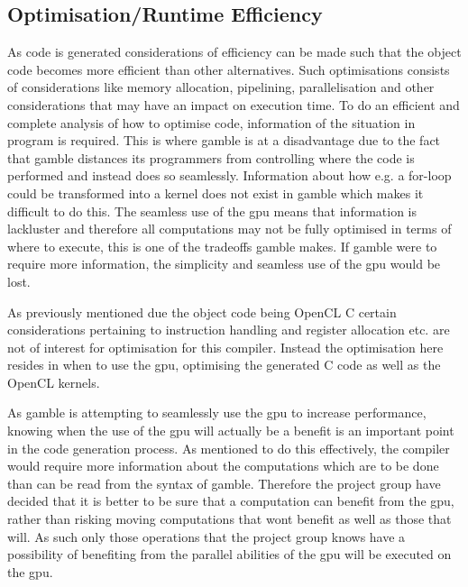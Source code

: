 \subsection*{Optimisation/Runtime Efficiency}\label{optimisation}
As code is generated considerations of efficiency can be made such that the object code becomes more efficient than other alternatives.
Such optimisations consists of considerations like memory allocation, pipelining, parallelisation and other considerations that may have an impact on execution time.
To do an efficient and complete analysis of how to optimise code, information of the situation in program is required.
This is where \gls{gamble} is at a disadvantage due to the fact that \gls{gamble} distances its programmers from controlling where the code is performed and instead does so seamlessly.
Information about how e.g. a for-loop could be transformed into a kernel does not exist in \gls{gamble} which makes it difficult to do this.
The seamless use of the \acrshort{gpu} means that information is lackluster and therefore all computations may not be fully optimised in terms of where to execute, this is one of the tradeoffs \gls{gamble} makes.
If \gls{gamble} were to require more information, the simplicity and seamless use of the \acrshort{gpu} would be lost.

As previously mentioned due the object code being OpenCL C certain considerations pertaining to instruction handling and register allocation etc. are not of interest for optimisation for this compiler.
Instead the optimisation here resides in when to use the \acrshort{gpu}, optimising the generated C code as well as the OpenCL kernels.

As \gls{gamble} is attempting to seamlessly use the \acrshort{gpu} to increase performance, knowing when the use of the \acrshort{gpu} will actually be a benefit is an important point in the code generation process.
As mentioned to do this effectively, the compiler would require more information about the computations which are to be done than can be read from the syntax of \gls{gamble}.
Therefore the project group have decided that it is better to be sure that a computation can benefit from the \acrshort{gpu}, rather than risking moving computations that wont benefit as well as those that will.
As such only those operations that the project group knows have a possibility of benefiting from the parallel abilities of the \acrshort{gpu} will be executed on the \acrshort{gpu}.

